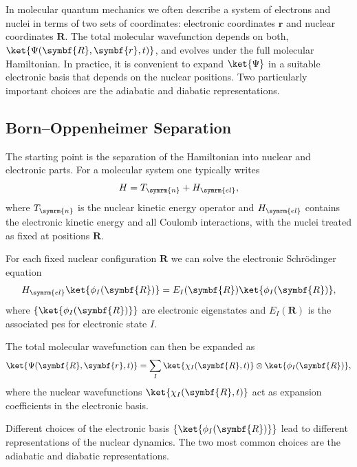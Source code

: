 \section{\filetotitle}\label{sec:adiabatic_vs_diabatic_representation}
In molecular quantum mechanics we often describe a system of electrons and nuclei in terms of two sets of coordinates: electronic coordinates $\symbf{r}$ and nuclear coordinates $\symbf{R}$. The total molecular wavefunction depends on both, $\ket{\Psi(\symbf{R},\symbf{r},t)}$, and evolves under the full molecular Hamiltonian. In practice, it is convenient to expand $\ket{\Psi}$ in a suitable electronic basis that depends on the nuclear positions. Two particularly important choices are the adiabatic and diabatic representations.
\subsection{Born--Oppenheimer Separation}\label{sec:born_oppenheimer_separation}
The starting point is the separation of the Hamiltonian into nuclear and electronic parts. For a molecular system one typically writes
\begin{equation}\label{eq:boa_hamiltonian}
H=T_{\symrm{n}}+H_{\symrm{el}},
\end{equation}
where $T_{\symrm{n}}$ is the nuclear kinetic energy operator and $H_{\symrm{el}}$ contains the electronic kinetic energy and all Coulomb interactions, with the nuclei treated as fixed at positions $\symbf{R}$.

For each fixed nuclear configuration $\symbf{R}$ we can solve the electronic Schr\"odinger equation
\begin{equation}
H_{\symrm{el}}\ket{\phi_I(\symbf{R})}=E_I(\symbf{R})\ket{\phi_I(\symbf{R})},
\end{equation}
where $\{\ket{\phi_I(\symbf{R})}\}$ are electronic eigenstates and $E_I(\symbf{R})$ is the associated \acrfull{pes} for electronic state $I$.

The total molecular wavefunction can then be expanded as
\begin{equation}\label{eq:boa_expansion}
\ket{\Psi(\symbf{R},\symbf{r},t)}=\sum_I\ket{\chi_I(\symbf{R},t)}\otimes\ket{\phi_I(\symbf{R})},
\end{equation}
where the nuclear wavefunctions $\ket{\chi_I(\symbf{R},t)}$ act as expansion coefficients in the electronic basis.

Different choices of the electronic basis $\{\ket{\phi_I(\symbf{R})}\}$ lead to different representations of the nuclear dynamics. The two most common choices are the adiabatic and diabatic representations.
